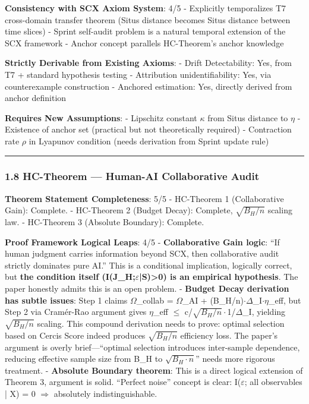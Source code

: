 \documentclass[
  12pt,
]{article}
\begin{document}
\textbf{Consistency with SCX Axiom System}: 4/5
- Explicitly temporalizes T7 cross-domain transfer theorem (Situs distance becomes Situs distance between time slices)
- Sprint self-audit problem is a natural temporal extension of the SCX framework
- Anchor concept parallels HC-Theorem's anchor knowledge

\textbf{Strictly Derivable from Existing Axioms}:
- Drift Detectability: Yes, from T7 + standard hypothesis testing
- Attribution unidentifiability: Yes, via counterexample construction
- Anchored estimation: Yes, directly derived from anchor definition

\textbf{Requires New Assumptions}:
- Lipschitz constant $\kappa$ from Situs distance to $\eta$
- Existence of anchor set (practical but not theoretically required)
- Contraction rate $\rho$ in Lyapunov condition (needs derivation from Sprint update rule)

\begin{center}\rule{0.5\linewidth}{0.5pt}\end{center}

\subsubsection{1.8 HC-Theorem --- Human-AI Collaborative Audit}\label{hc-theorem}

\textbf{Theorem Statement Completeness}: 5/5
- HC-Theorem 1 (Collaborative Gain): Complete.
- HC-Theorem 2 (Budget Decay): Complete, $\sqrt{B_H/n}$ scaling law.
- HC-Theorem 3 (Absolute Boundary): Complete.

\textbf{Proof Framework Logical Leaps}: 4/5
- \textbf{Collaborative Gain logic}: ``If human judgment carries information beyond SCX, then collaborative audit strictly dominates pure AI.'' This is a conditional implication, logically correct, but \textbf{the condition itself (I(J\_H;$\varepsilon$|S)>0) is an empirical hypothesis}. The paper honestly admits this is an open problem.
- \textbf{Budget Decay derivation has subtle issues}: Step 1 claims $\Omega$\_collab = $\Omega$\_AI + (B\_H/n)$\cdot\Delta$\_I$\cdot\eta$\_eff, but Step 2 via Cram\'{e}r-Rao argument gives $\eta$\_eff $\leq$ c/$\sqrt{B_H/n}\cdot$1/$\Delta$\_I, yielding $\sqrt{B_H/n}$ scaling. This compound derivation needs to prove: optimal selection based on Cercis Score indeed produces $\sqrt{B_H/n}$ efficiency loss. The paper's argument is overly brief---``optimal selection introduces inter-sample dependence, reducing effective sample size from B\_H to $\sqrt{B_H\cdot n}$'' needs more rigorous treatment.
- \textbf{Absolute Boundary theorem}: This is a direct logical extension of Theorem 3, argument is solid. ``Perfect noise'' concept is clear: I($\varepsilon$; all observables | X) = 0 $\Rightarrow$ absolutely indistinguishable.
\end{document}
